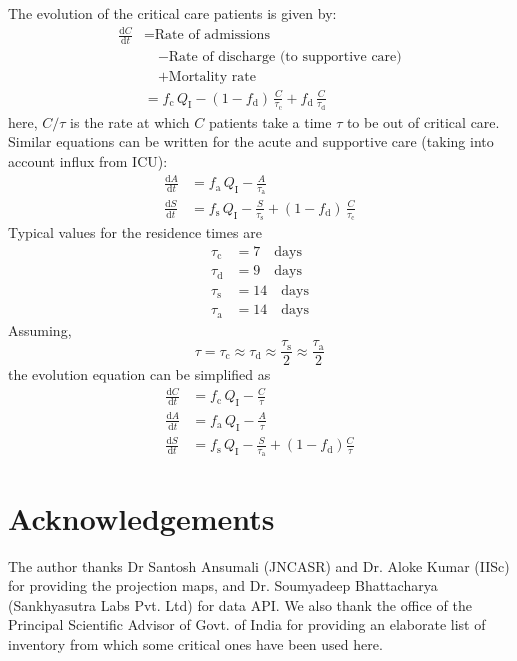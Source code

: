 \documentclass{article}
\newcommand{\rmd}{{\mathrm{d}}}
\newcommand{\der}[2]{\ensuremath{\frac{\rmd #1}{\rmd #2}}}
\newcommand{\fd}{\ensuremath{f_{\mathrm{d}}}}
\newcommand{\fc}{\ensuremath{f_{\mathrm{c}}}}
\newcommand{\fa}{\ensuremath{f_{\mathrm{a}}}}
\newcommand{\fs}{\ensuremath{f_{\mathrm{s}}}}
\newcommand{\taud}{\ensuremath{\tau_{\mathrm{d}}}}
\newcommand{\tauc}{\ensuremath{\tau_{\mathrm{c}}}}
\newcommand{\taua}{\ensuremath{\tau_{\mathrm{a}}}}
\newcommand{\taus}{\ensuremath{\tau_{\mathrm{s}}}}
\newcommand{\Qi}{\ensuremath{Q_{\mathrm{I}}}}
\begin{document}
The evolution of the critical care patients is given by:
\begin{equation}
  \label{eq:C}
  \begin{split}
\der{C}{t}
  &= \text{Rate of admissions}\\
  & \quad - \text{Rate of discharge (to supportive care)}\\
  & \quad + \text{Mortality rate} \\
  & = \fc \, \Qi
    - (1-\fd) \, \frac{C}{\tauc}
    + \fd \, \frac{C}{\taud}
  \end{split}
\end{equation}
here, $C/\tau$ is the rate at which $C$ patients take a time $\tau$ to
be out of critical care. Similar equations can be written for the
acute and supportive care (taking into account influx from ICU):
\begin{align}
  \der{A}{t} & = \fa \, \Qi - \frac{A}{\taua} \\
  \der{S}{t} & = \fs \, \Qi - \frac{S}{\taus} + (1-\fd) \,
               \frac{C}{\tauc} 
\end{align}
Typical values for the residence times are
\begin{align}
  \tauc &= 7 \quad\text{days} \\
  \taud &= 9 \quad\text{days} \\
  \taus &= 14 \quad\text{days} \\
  \taua &= 14 \quad\text{days} 
\end{align}
Assuming,
\begin{equation}
  \tau = \tauc \approx \taud \approx \frac{\taus}{2} \approx \frac{\taua}{2}
\end{equation}
the evolution equation can be simplified as
\begin{align}
  \der{C}{t} & = \fc \, \Qi - \frac{C}{\tau} \\
  \der{A}{t} & = \fa \, \Qi - \frac{A}{\tau} \\
  \der{S}{t} & = \fs \, \Qi - \frac{S}{\taua} + (1-\fd) \frac{C}{\tau}
\end{align}




\section{Acknowledgements}
The author thanks Dr Santosh Ansumali (JNCASR) and Dr. Aloke Kumar
(IISc) for providing the projection maps, and Dr. Soumyadeep
Bhattacharya (Sankhyasutra Labs Pvt. Ltd) for data API. We also thank
the office of the Principal Scientific Advisor of Govt. of India for
providing an elaborate list of inventory from which some critical ones
have been used here.
\end{document}
